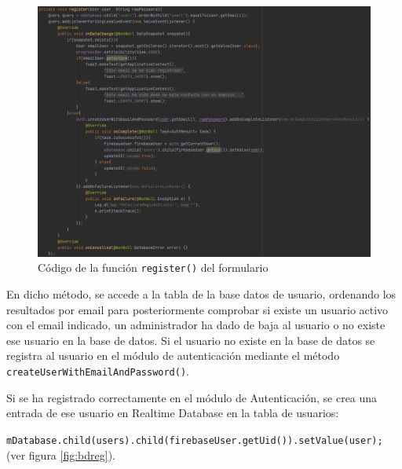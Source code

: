 \begin{figure}[H]
    \centering
    \includegraphics[width=\textwidth]{Images/Capitulo7/registerfunct.png}
        \caption{Código de la función \texttt{register()} del formulario}
    \label{fig:registerfunct}
\end{figure}
En dicho método, se accede a la tabla de la base datos de usuario, ordenando los resultados por email para posteriormente comprobar si existe un usuario activo con el email indicado, un administrador ha dado de baja al usuario o no existe ese usuario en la base de datos. Si el usuario no existe en la base de datos se registra al usuario en el módulo de autenticación mediante el método \texttt{createUserWithEmailAndPassword()}.

Si se ha registrado correctamente en el módulo de Autenticación, se crea una entrada de ese usuario en Realtime Database en la tabla de usuarios:

\texttt{mDatabase.child(users).child(firebaseUser.getUid()).setValue(user);}
(ver figura \ref{fig:bdreg}).

